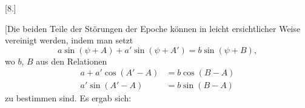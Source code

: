 \begingroup
{}
\renewcommand{\headrulewidth}{0pt}
\par\medskip
{}
\begin{center}[8.]\end{center}
\par\noindent\hspace*{\parindent}[Die beiden Teile der Störungen der Epoche können in leicht ersichtlicher Weise vereinigt werden, indem man setzt
\[
a\sin(\psi+A)+a'\sin(\psi+A')=b\sin(\psi+B),
\]
wo \(b\), \(B\) aus den Relationen
\[
\begin{aligned}
a+a'\cos(A'-A)&=b\cos(B-A)\\
a'\sin(A'-A)&=b\sin(B-A)
\end{aligned}
\]
zu bestimmen sind. Es ergab sich:
\par
{}
\begingroup\small
